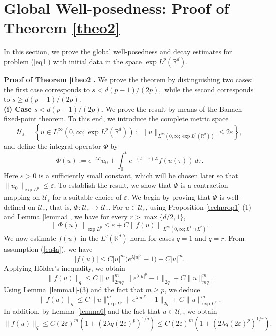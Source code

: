 \documentclass[a4paper,11pt]{amsart}
\renewcommand\eqref[1]{(\ref{#1})} %
\numberwithin{equation}{section}
\theoremstyle{plain}
\theoremstyle{definition}
\begin{document}
\section{Global Well-posedness: Proof of Theorem \ref{theo2}}\label{sec5}
In this section, we prove the global well-posedness and decay estimates for problem \eqref{eq1}  with initial data in the space $\exp L^p(\mathbb R^d)$.

{\bf Proof of Theorem \ref{theo2}.}  We prove the theorem by distinguishing two cases: the first case corresponds to $s < d(p-1)/(2p),$ while the second corresponds to $s \geq d(p-1)/(2p).$\\
\textbf{(i) Case $s < d(p-1)/(2p)$.} We prove the result by means of the Banach fixed-point theorem. To this end, we introduce the complete metric space
\[
\mathcal{U}_\varepsilon
=
\left\{
u \in L^\infty(0,\infty;\exp L^p(\mathbb{R}^d))
\;:\;
\|u\|_{L^\infty(0,\infty;\exp L^p(\mathbb{R}^d))}
\le 2\varepsilon
\right\},
\]
and define the integral operator $\Phi$ by
\[
\Phi(u)
:=
e^{-t\mathcal{L}}u_0
+
\int_0^t e^{-(t-\tau)\mathcal{L}} f(u(\tau))\, d\tau.
\]
Here $\varepsilon>0$ is a sufficiently small constant, 
which will be chosen later so that
$
\|u_0\|_{\exp L^p}
\le \varepsilon.
$
To establish the result, we show that $\Phi$ is a contraction 
mapping on $\mathcal{U}_\varepsilon$ for a suitable choice of 
$\varepsilon$. We begin by proving that $\Phi$ is well-defined on $\mathcal{U}_\varepsilon$, that is, $\Phi:\mathcal{U}_\varepsilon\rightarrow \mathcal{U}_\varepsilon$. For $u\in \mathcal{U}_\varepsilon$, using Proposition \ref{techprop1}-(1) and Lemma \ref{lemma4}, we have for every $r>\max\{d/2,1\}$,
$$
\left\|\Phi(u)\right\|_{\exp L^p}\leq\varepsilon+C\left\|f(u)\right\|_{L^\infty(0,\infty;L^1\cap L^r)}.
$$
We now estimate \( f(u) \) in the \( L^q(\mathbb{R}^d) \)-norm for cases \( q = 1 \) and \( q = r \).
From assumption \eqref{eq4a}, we have
\[
|f(u)| \le  C |u|^{m}\big(e^{\lambda |u|^p}-1\big) + C |u|^{m}.
\]
Applying H\"older's inequality, we obtain
$$
\|f(u)\|_{q}
\leq C \|u\|_{2mq}^{m}
\|e^{\lambda |u|^p}-1\|_{2q}
+ C \|u\|_{mq}^{m}.
$$
Using Lemma~\ref{lemma1}-(3) and the fact that $m \ge p$, we deduce
\[
\|f(u)\|_{q}
\le
C \|u\|_{\exp L^p}^{m}
\|e^{\lambda |u|^p}-1\|_{2q}
+ C \|u\|_{\exp L^p}^{m}.
\]
In addition, by Lemma~\ref{lemma6} and the fact that $u \in \mathcal{U}_\varepsilon$, we obtain
\begin{equation}\label{eq19}
\|f(u)\|_{q}
\le
C (2\varepsilon)^m
\left( 1 + (2\lambda q (2\varepsilon)^p)^{1/q} \right)
\le
C (2\varepsilon)^m
\left( 1 + (2\lambda q (2\varepsilon)^p)^{1/r} \right).
\end{equation}
\end{document}
